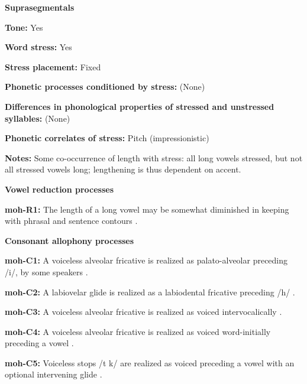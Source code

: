 \textbf{Suprasegmentals}



\textbf{Tone:} Yes



\textbf{Word stress:} Yes



\textbf{Stress placement:} Fixed



\textbf{Phonetic processes conditioned by stress:} (None)



\textbf{Differences in phonological properties of stressed and unstressed syllables:} (None)



\textbf{Phonetic correlates of stress:} Pitch (impressionistic)



\textbf{Notes:} Some co-occurrence of length with stress: all long vowels stressed, but not all stressed vowels long; lengthening is thus dependent on accent.



\textbf{Vowel reduction processes}



\textbf{moh-R1:} The length of a long vowel may be somewhat diminished in keeping with phrasal and sentence contours \citep[46]{Bonvillain1973}.



\textbf{Consonant allophony processes}



\textbf{moh-C1:} A voiceless alveolar fricative is realized as palato-alveolar preceding /i/, by some speakers \citep[31]{Bonvillain1973}.



\textbf{moh-C2:} A labiovelar glide is realized as a labiodental fricative preceding /h/ \citep[34]{Bonvillain1973}.



\textbf{moh-C3:} A voiceless alveolar fricative is realized as voiced intervocalically \citep{Bonvillain1973}.



\textbf{moh-C4:} A voiceless alveolar fricative is realized as voiced word-initially preceding a vowel \citep{Bonvillain1973}.



\textbf{moh-C5:} Voiceless stops /t k/ are realized as voiced preceding a vowel with an optional intervening glide \citep[28]{Bonvillain1973}.



